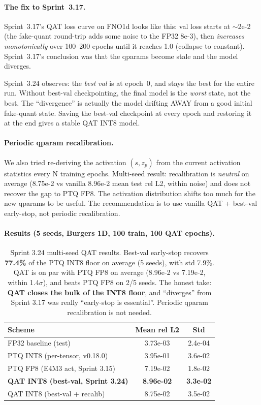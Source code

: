 \documentclass[10pt,twocolumn]{article}
\begin{document}
\paragraph{The fix to Sprint~3.17.}
Sprint~3.17's QAT loss curve on FNO1d looks like
this: val loss starts at $\sim$2e-2 (the fake-quant
round-trip adds some noise to the FP32 8e-3), then
\textit{increases monotonically} over 100--200
epochs until it reaches 1.0 (collapse to constant).
Sprint~3.17's conclusion was that the qparams become
stale and the model diverges.

Sprint~3.24 observes: the \emph{best val} is at
epoch~0, and stays the best for the entire run.
Without best-val checkpointing, the final model is
the \emph{worst} state, not the best.  The
``divergence'' is actually the model drifting AWAY
from a good initial fake-quant state.  Saving the
best-val checkpoint at every epoch and restoring it
at the end gives a stable QAT INT8 model.

\paragraph{Periodic qparam recalibration.}
We also tried re-deriving the activation $(s, z_p)$
from the current activation statistics every N
training epochs.  Multi-seed result: recalibration
is \emph{neutral} on average (8.75e-2 vs vanilla
8.96e-2 mean test rel L2, within noise) and does
not recover the gap to PTQ FP8.  The activation
distribution shifts too much for the new qparams
to be useful.  The recommendation is to use vanilla
QAT + best-val early-stop, not periodic
recalibration.

\paragraph{Results (5 seeds, Burgers 1D, 100 train, 100 QAT epochs).}

\begin{table}[h]
\centering
\begin{tabular}{lcc}
\hline
\textbf{Scheme} & \textbf{Mean rel L2} & \textbf{Std} \\
\hline
FP32 baseline (test) & 3.73e-03 & 2.4e-04 \\
PTQ INT8 (per-tensor, v0.18.0) & 3.95e-01 & 3.6e-02 \\
PTQ FP8 (E4M3 act, Sprint 3.15) & 7.19e-02 & 1.8e-02 \\
\textbf{QAT INT8 (best-val, Sprint 3.24)} & \textbf{8.96e-02} & \textbf{3.3e-02} \\
QAT INT8 (best-val + recalib) & 8.75e-02 & 3.5e-02 \\
\hline
\end{tabular}
\caption{Sprint 3.24 multi-seed QAT results.  Best-val
early-stop recovers \textbf{77.4\%} of the PTQ INT8
floor on average (5 seeds), with std 7.9\%.  QAT is
on par with PTQ FP8 on average (8.96e-2 vs 7.19e-2,
within 1.4$\sigma$), and beats PTQ FP8 on 2/5 seeds.
The honest take: \textbf{QAT closes the bulk of the
INT8 floor}, and ``diverges'' from Sprint 3.17 was
really ``early-stop is essential''.  Periodic
qparam recalibration is not needed.}
\label{tab:qat-bestval}
\end{table}
\end{document}
